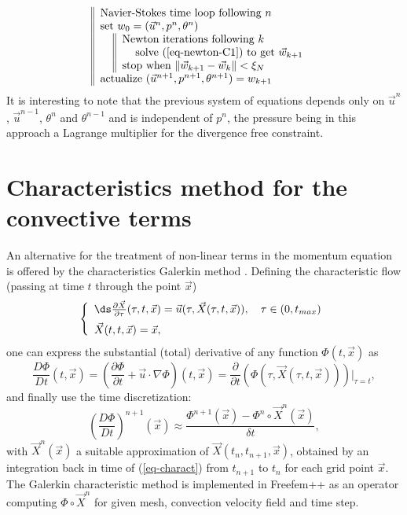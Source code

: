 \begin{equation} \label{eq-Newton-algo}
\begin{tabular}{||ll}
\multicolumn{2}{||l}{Navier-Stokes time loop following $n$}\\
\multicolumn{2}{||l}{set  $w_0=(\vec{u}^{n}, p^{n}, \theta^{n})$}\\
& \begin{tabular}[t]{||ll}
\multicolumn{2}{||l}{Newton iterations  following $k$}\\
&solve (\ref{eq-newton-C1}) to get $ \vec w_{k+1} $\\
\multicolumn{2}{||l}{stop when  $\| \vec w_{k+1} - \vec w_k \| < \xi_N$}
\end{tabular}\\
\multicolumn{2}{||l}{actualize $(\vec{u}^{n+1}, p^{n+1}, \theta^{n+1}) = w_{k+1}$}
\end{tabular}
\end{equation}
It is interesting to note that the previous system of equations depends only on $\vec{u}^n$, $\vec{u}^{n-1}$, $\theta^n$ and $\theta^{n-1}$ and is independent of $p^n$, the pressure being in this approach a Lagrange multiplier for the divergence free constraint. 

\section{Characteristics method for the convective terms} \label{sec-charac-FreeFem}

An alternative for the treatment of non-linear terms in the momentum equation is offered by the characteristics Galerkin method \cite{Pironneau92}. Defining the characteristic flow (passing at time $t$ through the point $\vec{x}$)
\begin{equation}
\left\{
\begin{array}{l}\vspace{0.2cm}
\ds\frac{\partial \vec{X} }{\partial \tau}(\tau, t, \vec{x})=\vec{u} (\tau,\vec{X} (\tau,t, \vec{x})), \quad \tau\in (0,t_{max})\\
\vec{X} (t, t, \vec{x}) = \vec{x},
\end{array}
\right.
\label{eq-charactD}
\end{equation}
one can express the substantial (total) derivative of any function $\Phi(t,\vec{x})$ as
\begin{equation}
\frac{D\Phi}{Dt}(t,\vec{x})=\left( \frac{\partial \Phi}{\partial
	t}+\vec{u}\cdot\nabla \Phi \right)(t,\vec{x})=\frac{\partial}{\partial
	t}\left(\Phi(\tau, \vec{X}(\tau,t, \vec{x}))\right)|_{\tau=t},
\end{equation}
and finally use the time discretization:
\begin{equation}
\left(\frac{D\Phi}{Dt}\right)^{n+1}(\vec{x})\approx\frac{\Phi^{n+1}(\vec{x})-\Phi^{n}\circ \vec{X}^n(\vec{x})}{\delta t},
\end{equation}
with $\vec{X}^n(\vec{x})$ a suitable approximation of $\vec{X}(t_n,t_{n+1},\vec{x})$, obtained by an integration back in time of (\ref{eq-charact}) from $t_{n+1}$ to $t_n$ for each grid point $\vec{x}$. The Galerkin characteristic method is implemented in Freefem++ as an operator computing $\Phi \circ \vec{X}^n$ for given mesh, convection velocity field and time step.

